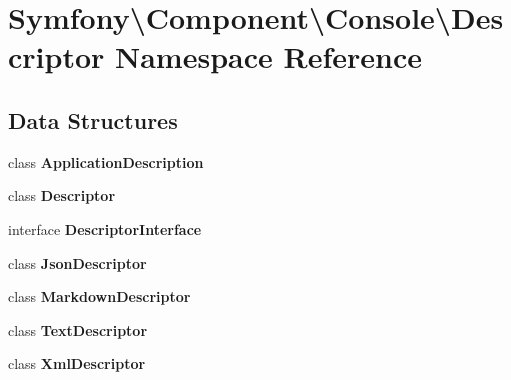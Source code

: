 \section{Symfony\textbackslash{}Component\textbackslash{}Console\textbackslash{}Descriptor Namespace Reference}
\label{namespace_symfony_1_1_component_1_1_console_1_1_descriptor}
\subsection*{Data Structures}
\begin{DoxyCompactItemize}
\item 
class {\bf Application\+Description}
\item 
class {\bf Descriptor}
\item 
interface {\bf Descriptor\+Interface}
\item 
class {\bf Json\+Descriptor}
\item 
class {\bf Markdown\+Descriptor}
\item 
class {\bf Text\+Descriptor}
\item 
class {\bf Xml\+Descriptor}
\end{DoxyCompactItemize}
